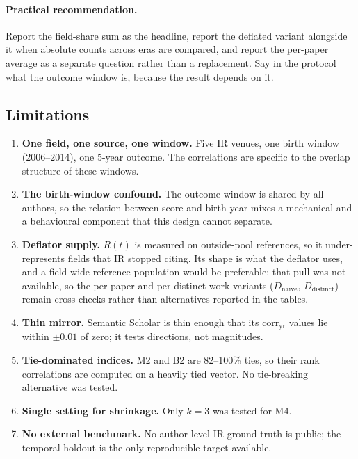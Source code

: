 \documentclass{article}
\begin{document}
\paragraph{Practical recommendation.} Report the field-share sum as the headline, report the
deflated variant alongside it when absolute counts across eras are compared, and report the
per-paper average as a separate question rather than a replacement. Say in the protocol what the
outcome window is, because the result depends on it.

\subsection{Limitations}

\begin{enumerate}
  \item \textbf{One field, one source, one window.} Five IR venues, one birth window
    (2006--2014), one 5-year outcome. The correlations are specific to the overlap structure of
    these windows.
  \item \textbf{The birth-window confound.} The outcome window is shared by all authors, so the
    relation between score and birth year mixes a mechanical and a behavioural component that
    this design cannot separate.
  \item \textbf{Deflator supply.} $R(t)$ is measured on outside-pool references, so it
    under-represents fields that IR stopped citing. Its shape is what the deflator uses, and a
    field-wide reference population would be preferable; that pull was not available, so the
    per-paper and per-distinct-work variants ($D_{\text{naive}}$, $D_{\text{distinct}}$) remain
    cross-checks rather than alternatives reported in the tables.
  \item \textbf{Thin mirror.} Semantic Scholar is thin enough that its $\text{corr}_{\text{yr}}$
    values lie within $\pm0.01$ of zero; it tests directions, not magnitudes.
  \item \textbf{Tie-dominated indices.} M2 and B2 are 82--100\% ties, so their rank correlations
    are computed on a heavily tied vector. No tie-breaking alternative was tested.
  \item \textbf{Single setting for shrinkage.} Only $k=3$ was tested for M4.
  \item \textbf{No external benchmark.} No author-level IR ground truth is public; the temporal
    holdout is the only reproducible target available.
\end{enumerate}
\end{document}
